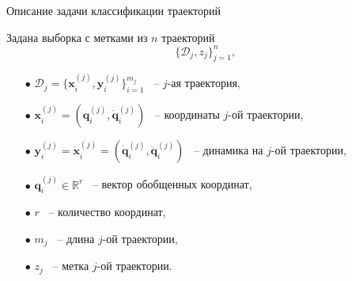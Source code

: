 \documentclass{beamer}
\begin{document}

\begin{frame}{Описание задачи классификации траекторий}

    Задана выборка с метками из $n$ траекторий
    $$\{ \mathcal{D}_j, z_j\}_{j=1}^n,$$ 

    \begin{itemize}

        \item[$\bullet$] $\mathcal{D}_j = \{ \mathbf{x}_i^{(j)}, \mathbf{y}_i^{(j)} \}_{i=1}^{m_j}$ ~-- $j$-ая траектория,

        \item[$\bullet$] $\mathbf{x}_i^{(j)} = (\mathbf{q}_i^{(j)}, \mathbf{\dot{q}}_i^{(j)})$ ~-- координаты $j$-ой траектории, 

        \item[$\bullet$] $\mathbf{y}_i^{(j)} = \mathbf{\dot{x}}_i^{(j)} = (\mathbf{\dot{q}}_i^{(j)}, \mathbf{\ddot{q}}_i^{(j)})$ ~-- динамика на $j$-ой траектории, 

        \item[$\bullet$] $\mathbf{q}_i^{(j)} \in \mathbb{R}^r$ ~-- вектор обобщенных координат,

        \item[$\bullet$] $r$ ~-- количество координат,

        \item[$\bullet$] $m_j$ ~-- длина $j$-ой траектории,

        \item[$\bullet$] $z_j$ ~-- метка $j$-ой траектории.
        
    \end{itemize}

\end{frame}    

\end{document}
